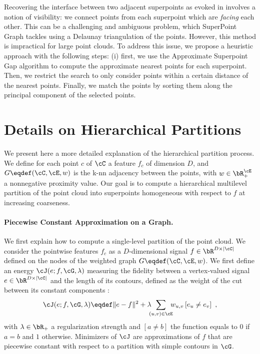 Recovering the interface between two adjacent superpoints as evoked in  involves a notion of visibility: we connect points from each superpoint which are \emph{facing} each other. This can be a challenging and ambiguous problem, which SuperPoint Graph \cite{landrieu2016cut} tackles using a Delaunay triangulation of the points. However, this method is impractical for large point clouds. To address this issue, we propose a heuristic approach with the following steps: (i) first, we use the Approximate Superpoint Gap algorithm to compute the approximate nearest points for each superpoint. Then, we restrict the search to only consider points within a certain distance of the nearest points. Finally, we match the points by sorting them along the principal component of the selected points.

\section{Details on Hierarchical Partitions}
\label{sec:pcp}
We present here a more detailed explanation of the hierarchical partition process. We define for each point $c$ of $\cC$ a feature $f_c$ of dimension $D$, and $G\eqdef(\cC,\cE,w)$ is the k-nn adjacency between the points, with $w \in \bR_+^\cE$ a nonnegative proximity value. Our goal is to compute a hierarchical multilevel partition of the point cloud into superpoints homogeneous with respect to $f$ at increasing coarseness. 

\paragraph{Piecewise Constant Approximation on a Graph.}
We first explain how to compute a single-level partition of the point cloud.
We consider the pointwise features $f_c$ as a $D$-dimensional signal $f \in \bR^{D \times \vert \cC \vert}$ defined on the nodes of the weighted graph $G\eqdef(\cC,\cE,w)$. 
We first define an energy $\cJ(e; f, \cG, \lambda)$ measuring the fidelity between a vertex-valued signal $e \in \bR^{D \times \vert \cC \vert}$ and the length of its contours, defined as the weight of the cut between its constant components \cite{landrieu2016cut}:
\begin{align}\label{eq:gmpp}
\cJ(e; f, \cG, \lambda)
\eqdef
\Vert e - {f}\Vert^2
+ \lambda\!\!\!
\sum_{(u,v) \in \cE}\!\!\!
w_{u,v}
\left[
e_u \neq e_v
\right]~,
\end{align}
with $\lambda \in \bR_+$ a regularization strength and $[a \neq b]$ the function equals to $0$ if $a=b$ and $1$ otherwise. Minimizers of $\cJ$ are approximations of $f$ that are piecewise constant with respect to a partition with simple contours in $\cG$.

